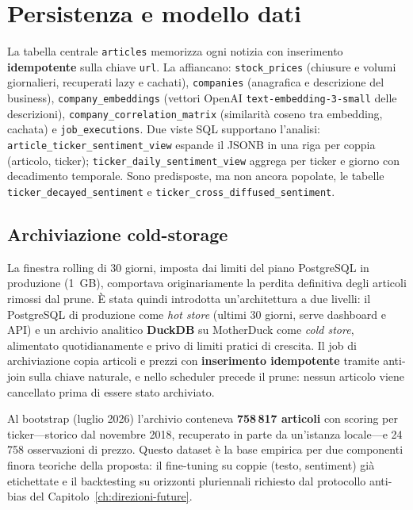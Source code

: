 \section{Persistenza e modello dati}

La tabella centrale \texttt{articles} memorizza ogni notizia con inserimento \textbf{idempotente} sulla chiave \texttt{url}.
La affiancano: \texttt{stock\_prices} (chiusure e volumi giornalieri, recuperati lazy e cachati), \texttt{companies} (anagrafica e descrizione del business), \texttt{company\_embeddings} (vettori OpenAI \texttt{text-embedding-3-small} delle descrizioni), \texttt{company\_correlation\_matrix} (similarità coseno tra embedding, cachata) e \texttt{job\_executions}.
Due viste SQL supportano l'analisi: \texttt{article\_ticker\_sentiment\_view} espande il JSONB in una riga per coppia (articolo, ticker); \texttt{ticker\_daily\_sentiment\_view} aggrega per ticker e giorno con decadimento temporale.
Sono predisposte, ma non ancora popolate, le tabelle \texttt{ticker\_decayed\_sentiment} e \texttt{ticker\_cross\_diffused\_sentiment}.

\subsection{Archiviazione cold-storage}
\label{sec:cold-storage}

La finestra rolling di 30 giorni, imposta dai limiti del piano PostgreSQL in produzione (1~GB), comportava originariamente la perdita definitiva degli articoli rimossi dal prune.
È stata quindi introdotta un'architettura a due livelli: il PostgreSQL di produzione come \emph{hot store} (ultimi 30 giorni, serve dashboard e API) e un archivio analitico \textbf{DuckDB} su MotherDuck come \emph{cold store}, alimentato quotidianamente e privo di limiti pratici di crescita.
Il job di archiviazione copia articoli e prezzi con \textbf{inserimento idempotente} tramite anti-join sulla chiave naturale, e nello scheduler precede il prune: nessun articolo viene cancellato prima di essere stato archiviato.

Al bootstrap (luglio 2026) l'archivio conteneva \textbf{758\,817 articoli} con scoring per ticker---storico dal novembre 2018, recuperato in parte da un'istanza locale---e 24\,758 osservazioni di prezzo.
Questo dataset è la base empirica per due componenti finora teoriche della proposta: il fine-tuning su coppie (testo, sentiment) già etichettate e il backtesting su orizzonti pluriennali richiesto dal protocollo anti-bias del Capitolo~\ref{ch:direzioni-future}.

